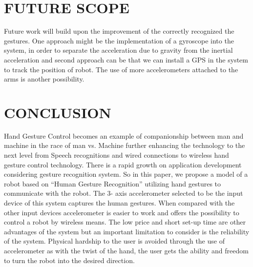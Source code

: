 \documentclass[12pt]{article}
\begin{document}
\pagebreak

\section{FUTURE SCOPE}
Future work will build upon the improvement of the correctly recognized the gestures. One approach might be the
implementation of a gyroscope into the system, in order to separate the acceleration due to gravity from the inertial
acceleration and second approach can be that we can install a GPS in the system to track the position of robot. The use
of more accelerometers attached to the arms is another possibility.


\section{CONCLUSION}
Hand Gesture Control becomes an example of companionship between man and machine in the race of man vs.
Machine further enhancing the technology to the next level from Speech recognitions and wired connections to wireless
hand gesture control technology. There is a rapid growth on application development considering gesture recognition
system. So in this paper, we propose a model of a robot based on “Human Gesture Recognition” utilizing hand gestures to communicate with the robot. The 3- axis accelerometer selected to be the input device of this system captures the
human gestures. When compared with the other input devices accelerometer is easier to work and offers the possibility to
control a robot by wireless means. The low price and short set-up time are other advantages of the system but an
important limitation to consider is the reliability of the system. Physical hardship to the user is avoided through the
use of accelerometer as with the twist of the hand, the user gets the ability and freedom to turn the robot into the desired
direction.



\newpage


\end{document}
